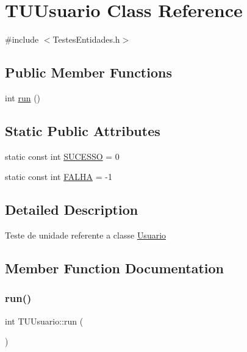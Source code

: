 \hypertarget{class_t_u_usuario}{}\section{T\+U\+Usuario Class Reference}
\label{class_t_u_usuario}


{\ttfamily \#include $<$Testes\+Entidades.\+h$>$}

\subsection*{Public Member Functions}
\begin{DoxyCompactItemize}
\item 
int \hyperlink{class_t_u_usuario_af12e1b9020cfb11a1f659373a70268fa}{run} ()
\end{DoxyCompactItemize}
\subsection*{Static Public Attributes}
\begin{DoxyCompactItemize}
\item 
static const int \hyperlink{class_t_u_usuario_aa9302e7d6f13452c83f21224fd335e54}{S\+U\+C\+E\+S\+SO} = 0
\item 
static const int \hyperlink{class_t_u_usuario_af1a7217e0d002f0d0b524c901bb75c98}{F\+A\+L\+HA} = -\/1
\end{DoxyCompactItemize}


\subsection{Detailed Description}
Teste de unidade referente a classe \hyperlink{class_usuario}{Usuario} 

\subsection{Member Function Documentation}
\mbox{\label{class_t_u_usuario_af12e1b9020cfb11a1f659373a70268fa}} 
\subsubsection{\texorpdfstring{run()}{run()}}
{\footnotesize\ttfamily int T\+U\+Usuario\+::run (\begin{DoxyParamCaption}{ }\end{DoxyParamCaption})}

